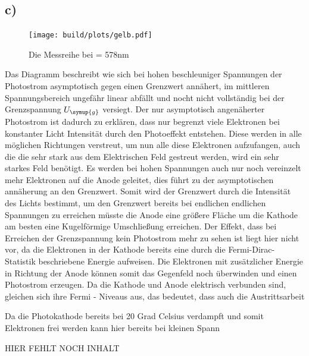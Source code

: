     \subsection{c)}

    \begin{figure}[H]
        \centering
        \texttt{[image: build/plots/gelb.pdf]}
        \caption{Die Messreihe bei \lambda = 578nm}
        \label{img:gelb}
    \end{figure}

    \noindent
    Das Diagramm beschreibt wie sich bei hohen beschleuniger Spannungen der Photostrom asymptotisch gegen einen Grenzwert annähert, im mittleren 
    Spannungsbereich ungefähr linear abfällt und nocht nicht vollständig bei der Grenzspannung $U_{\symup{g}}$ versiegt.
    Der nur asymptotisch angenäherter Photostrom ist dadurch zu erklären, dass nur begrenzt viele Elektronen bei konstanter Licht Intensität 
    durch den Photoeffekt entstehen. Diese werden in alle möglichen Richtungen verstreut, um nun alle diese Elektronen aufzufangen, auch die die sehr 
    stark aus dem Elektrischen Feld gestreut werden, wird ein sehr starkes Feld benötigt. Es werden bei hohen Spannungen auch nur noch vereinzelt
    mehr Elektronen auf die Anode geleitet, dies führt zu der asymptotischen annäherung an den Grenzwert. Somit wird der Grenzwert durch die 
    Intensität des Lichts bestimmt, um den Grenzwert bereits bei endlichen endlichen Spannungen zu erreichen müsste die Anode eine größere Fläche 
    um die Kathode am besten eine Kugelförmige Umschließung erreichen.
    Der Effekt, dass bei Erreichen der Grenzspannung kein Photostrom mehr zu sehen ist liegt hier nicht vor, da die Elektronen in der Kathode 
    bereits eine durch die Fermi-Dirac-Statistik beschriebene Energie aufweisen. Die Elektronen mit zusätzlicher Energie in Richtung der Anode 
    können somit das Gegenfeld noch überwinden und einen Photostrom erzeugen.
    Da die Kathode und Anode elektrisch verbunden sind, gleichen sich ihre Fermi - Niveaus aus, das bedeutet, dass auch die Austrittsarbeit 
    

    Da die Photokathode bereits bei 20 Grad Celsius verdampft und somit Elektronen frei werden kann hier bereits bei kleinen Spann

    HIER FEHLT NOCH INHALT

